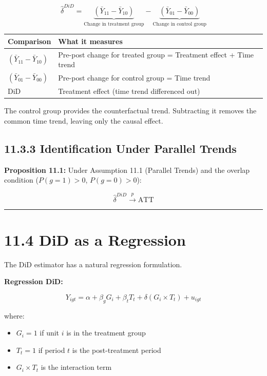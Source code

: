 \[
\hat{\delta}^{DiD} = \underbrace{(\bar{Y}_{11} - \bar{Y}_{10})}_{\text{Change in treatment group}} - \underbrace{(\bar{Y}_{01} - \bar{Y}_{00})}_{\text{Change in control group}}
\]

\begin{center}
\begin{tabular}{@{} l l @{}}
\toprule
\textbf{Comparison} & \textbf{What it measures} \\
\midrule
$(\bar{Y}_{11} - \bar{Y}_{10})$ & Pre-post change for treated group = Treatment effect + Time trend \\
$(\bar{Y}_{01} - \bar{Y}_{00})$ & Pre-post change for control group = Time trend \\
DiD & Treatment effect (time trend differenced out) \\
\bottomrule
\end{tabular}
\end{center}

The control group provides the counterfactual trend. Subtracting it removes the common time trend, leaving only the causal effect.

\subsection{11.3.3 Identification Under Parallel Trends}

\textbf{Proposition 11.1:} Under Assumption 11.1 (Parallel Trends) and the overlap condition ($P(g=1) > 0$, $P(g=0) > 0$):

\[
\hat{\delta}^{DiD} \xrightarrow{p} \text{ATT}
\]

\medskip\hrule\medskip

\section{11.4 DiD as a Regression}

The DiD estimator has a natural regression formulation.

\textbf{Regression DiD:}

\[
Y_{igt} = \alpha + \beta_g G_i + \beta_t T_t + \delta (G_i \times T_t) + u_{igt}
\]

where:
\begin{itemize}
\item $G_i = 1$ if unit $i$ is in the treatment group
\item $T_t = 1$ if period $t$ is the post-treatment period
\item $G_i \times T_t$ is the interaction term
\end{itemize}

